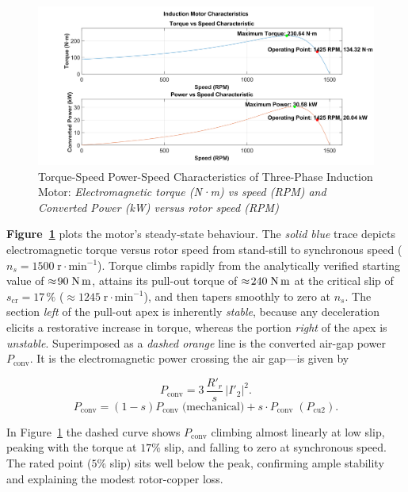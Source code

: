 \documentclass[a4paper,11pt]{IEEEtran}
\begin{document}
\begin{figure}[htbp]
    \centering
    \includegraphics[width=\textwidth]{correct_motor_characteristic.png}
    \caption{Torque-Speed Power-Speed Characteristics of Three-Phase Induction Motor: \textit{Electromagnetic torque (N·m) vs speed (RPM) and Converted Power (kW) versus rotor speed (RPM)}}
    \label{fig:motor_char}
\end{figure}



 
\noindent
\textbf{Figure~\ref{fig:motor_char}} plots the motor’s steady‐state behaviour.  
The \textit{solid blue} trace depicts electromagnetic torque versus rotor speed from stand-still to synchronous speed ($n_s=1500\;\text{r}\!\cdot\!\text{min}^{-1}$).  Torque climbs rapidly from the analytically verified starting value of $\approx\!90\;\text{N\,m}$, attains its pull-out torque of $\approx\!240\;\text{N\,m}$ at the critical slip of $s_{\text{cr}}\!=\!17\,\%$ ($\approx\!1245\;\text{r}\!\cdot\!\text{min}^{-1}$), and then tapers smoothly to zero at $n_s$. The section \emph{left} of the pull-out apex is inherently \emph{stable}, because any deceleration elicits a restorative increase in torque, whereas the portion \emph{right} of the apex is \emph{unstable}. Superimposed as a \textit{dashed orange} line is the converted air-gap power $P_{\text{conv}}$.  It is the electromagnetic power crossing the air gap---is given by

\begin{equation}
    P_{\text{conv}} = 3\,\frac{R'_r}{s}\,|I'_2|^{2}.
\end{equation}
\begin{equation}
    P_{\text{conv}} = (1-s)P_{\text{conv}}\;\text{(mechanical)} + s \cdot P_{\text{conv}}\;(P_{\text{cu2}}).
\end{equation}




In Figure~\ref{fig:motor_char} the dashed curve shows $P_{\text{conv}}$ climbing almost linearly at low slip, peaking with the torque at $17\%$ slip, and falling to zero at synchronous speed. The rated point ($5\%$ slip) sits well below the peak, confirming ample stability and explaining the modest rotor-copper loss.
\end{document}
